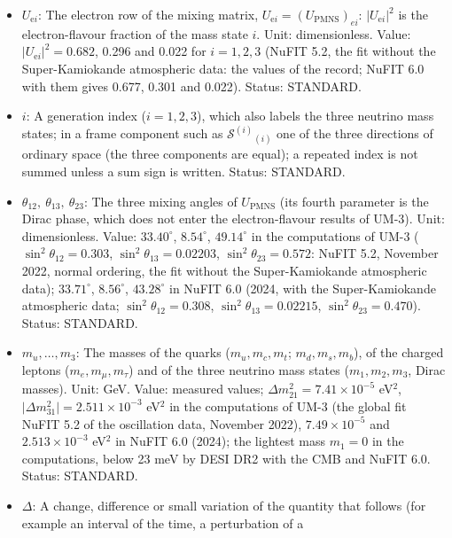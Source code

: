 \documentclass[
  10pt,
]{article}
\providecommand{\tightlist}{%
  \setlength{\itemsep}{0pt}\setlength{\parskip}{0pt}}
\begin{document}
\begin{itemize}
\tightlist
\item
  \(U_{\mathrm{e}i}\): The electron row of the mixing matrix,
  \(U_{\mathrm{e}i} = (U_{\mathrm{PMNS}})_{ei}\):
  \(\lvert U_{\mathrm{e}i}\rvert^2\) is the electron-flavour fraction of
  the mass state \(i\). Unit: dimensionless. Value:
  \(\lvert U_{\mathrm{e}i}\rvert^2 = 0.682\), 0.296 and 0.022 for
  \(i = 1, 2, 3\) (NuFIT 5.2, the fit without the Super-Kamiokande
  atmospheric data: the values of the record; NuFIT 6.0 with them gives
  0.677, 0.301 and 0.022). Status: STANDARD.
\item
  \(i\): A generation index (\(i = 1, 2, 3\)), which also labels the
  three neutrino mass states; in a frame component such as
  \(\mathcal{S}^{(i)}{}_{(i)}\) one of the three directions of ordinary
  space (the three components are equal); a repeated index is not summed
  unless a sum sign is written. Status: STANDARD.
\item
  \(\theta_{12},\ \theta_{13},\ \theta_{23}\): The three mixing angles
  of \(U_{\mathrm{PMNS}}\) (its fourth parameter is the Dirac phase,
  which does not enter the electron-flavour results of UM-3). Unit:
  dimensionless. Value: \(33.40^\circ\), \(8.54^\circ\), \(49.14^\circ\)
  in the computations of UM-3 (\(\sin^2\theta_{12} = 0.303\),
  \(\sin^2\theta_{13} = 0.02203\), \(\sin^2\theta_{23} = 0.572\): NuFIT
  5.2, November 2022, normal ordering, the fit without the
  Super-Kamiokande atmospheric data); \(33.71^\circ\), \(8.56^\circ\),
  \(43.28^\circ\) in NuFIT 6.0 (2024, with the Super-Kamiokande
  atmospheric data; \(\sin^2\theta_{12} = 0.308\),
  \(\sin^2\theta_{13} = 0.02215\), \(\sin^2\theta_{23} = 0.470\)).
  Status: STANDARD.
\item
  \(m_u, \dots, m_3\): The masses of the quarks (\(m_u, m_c, m_t\);
  \(m_d, m_s, m_b\)), of the charged leptons (\(m_e, m_\mu, m_\tau\))
  and of the three neutrino mass states (\(m_1, m_2, m_3\), Dirac
  masses). Unit: GeV. Value: measured values;
  \(\Delta m_{21}^2 = 7.41\times10^{-5}\) eV\(^2\),
  \(\lvert\Delta m_{31}^2\rvert = 2.511\times10^{-3}\) eV\(^2\) in the
  computations of UM-3 (the global fit NuFIT 5.2 of the oscillation
  data, November 2022), \(7.49\times10^{-5}\) and \(2.513\times10^{-3}\)
  eV\(^2\) in NuFIT 6.0 (2024); the lightest mass \(m_1 = 0\) in the
  computations, below 23 meV by DESI DR2 with the CMB and NuFIT 6.0.
  Status: STANDARD.
\item
  \(\Delta\): A change, difference or small variation of the quantity
  that follows (for example an interval of the time, a perturbation of a

\end{itemize}
\end{document}
